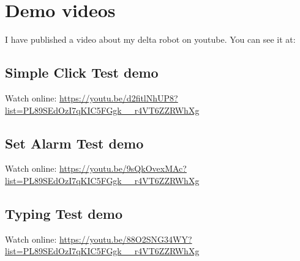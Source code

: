 
\chapter{Demo videos}
\label{ch:video_demo}
I have published a video about my delta robot on youtube. You can see it at: 
\raggedright
\section{Simple Click Test demo}
Watch online: \url{https://youtu.be/d2fitlNhUP8?list=PL89SEdOzI7qKIC5FGgk__r4VT6ZZRWhXg}

\section{Set Alarm Test demo}
Watch online: \url{https://youtu.be/9sQkOvexMAc?list=PL89SEdOzI7qKIC5FGgk__r4VT6ZZRWhXg}

\section{Typing Test demo}
Watch online: \url{https://youtu.be/88O2SNG34WY?list=PL89SEdOzI7qKIC5FGgk__r4VT6ZZRWhXg}